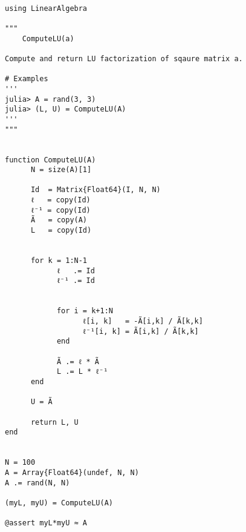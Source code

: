 \documentclass[12pt]{article}
\begin{document}
\begin{verbatim}

using LinearAlgebra

"""
    ComputeLU(a)

Compute and return LU factorization of sqaure matrix a.

# Examples
'''
julia> A = rand(3, 3)
julia> (L, U) = ComputeLU(A)
'''
"""


function ComputeLU(A)
      N = size(A)[1]

      Id  = Matrix{Float64}(I, N, N)
      ℓ   = copy(Id)
      ℓ⁻¹ = copy(Id)
      Ã   = copy(A)
      L   = copy(Id)


      for k = 1:N-1
            ℓ   .= Id
            ℓ⁻¹ .= Id


            for i = k+1:N
                  ℓ[i, k]   = -Ã[i,k] / Ã[k,k]
                  ℓ⁻¹[i, k] = Ã[i,k] / Ã[k,k]
            end

            Ã .= ℓ * Ã
            L .= L * ℓ⁻¹
      end

      U = Ã

      return L, U
end


N = 100
A = Array{Float64}(undef, N, N)
A .= rand(N, N)

(myL, myU) = ComputeLU(A)

@assert myL*myU ≈ A


\end{verbatim}
\end{document}
